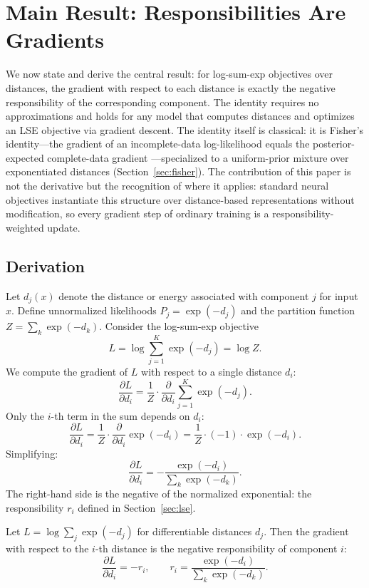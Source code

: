 \section{Main Result: Responsibilities Are Gradients}
\label{sec:main-result}

We now state and derive the central result: for log-sum-exp objectives over distances, the gradient with respect to each distance is exactly the negative responsibility of the corresponding component. The identity requires no approximations and holds for any model that computes distances and optimizes an LSE objective via gradient descent. The identity itself is classical: it is Fisher's identity---the gradient of an incomplete-data log-likelihood equals the posterior-expected complete-data gradient \citep{cappe2009online,bishop2006pattern}---specialized to a uniform-prior mixture over exponentiated distances (Section~\ref{sec:fisher}). The contribution of this paper is not the derivative but the recognition of where it applies: standard neural objectives instantiate this structure over distance-based representations without modification, so every gradient step of ordinary training is a responsibility-weighted update.

\subsection{Derivation}

Let $d_j(x)$ denote the distance or energy associated with component $j$ for input $x$. Define unnormalized likelihoods $P_j = \exp(-d_j)$ and the partition function $Z = \sum_k \exp(-d_k)$. Consider the log-sum-exp objective
\begin{equation}
L = \log \sum_{j=1}^{K} \exp(-d_j) = \log Z.
\end{equation}
We compute the gradient of $L$ with respect to a single distance $d_i$:
\[
\frac{\partial L}{\partial d_i} = \frac{1}{Z} \cdot \frac{\partial}{\partial d_i} \sum_{j=1}^{K} \exp(-d_j).
\]
Only the $i$-th term in the sum depends on $d_i$:
\[
\frac{\partial L}{\partial d_i} = \frac{1}{Z} \cdot \frac{\partial}{\partial d_i} \exp(-d_i) = \frac{1}{Z} \cdot (-1) \cdot \exp(-d_i).
\]
Simplifying:
\[
\frac{\partial L}{\partial d_i} = -\frac{\exp(-d_i)}{\sum_k \exp(-d_k)}.
\]
The right-hand side is the negative of the normalized exponential: the responsibility $r_i$ defined in Section~\ref{sec:lse}.

\begin{theorem}
\label{thm:main}
Let $L = \log \sum_j \exp(-d_j)$ for differentiable distances $d_j$. Then the gradient with respect to the $i$-th distance is the negative responsibility of component $i$:
\begin{equation}
\label{eq:main-identity}
\frac{\partial L}{\partial d_i} = -r_i, \qquad r_i = \frac{\exp(-d_i)}{\sum_k \exp(-d_k)}.
\end{equation}
\end{theorem}


